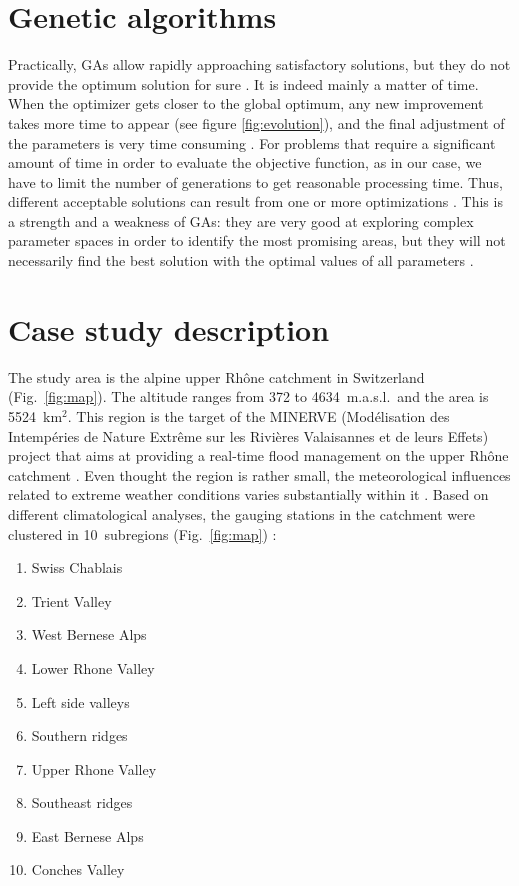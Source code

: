 \documentclass[5p]{elsarticle}
\begin{document}
\section{Genetic algorithms}
\label{sec:gas}



Practically, GAs allow rapidly approaching satisfactory solutions, but they do not provide the optimum solution for sure \citep{Zitzler2004a}. It is indeed mainly a matter of time. When the optimizer gets closer to the global optimum, any new improvement takes more time to appear (see figure \ref{fig:evolution}), and the final adjustment of the parameters is very time consuming \citep{Back1993a}. For problems that require a significant amount of time in order to evaluate the objective function, as in our case, we have to limit the number of generations to get reasonable processing time. Thus, different acceptable solutions can result from one or more optimizations \citep{Holland1992b}. This is a strength and a weakness of GAs: they are very good at exploring complex parameter spaces in order to identify the most promising areas, but they will not necessarily find the best solution with the optimal values of all parameters \citep{Holland1992b}.







\section{Case study description}
\label{sec:case_study}

The study area is the alpine upper Rh\^{o}ne catchment in Switzerland (Fig.\ \ref{fig:map}). The altitude ranges from 372 to 4634~m.a.s.l.\ and the area is 5524~km$^{2}$. This region is the target of the MINERVE (Mod\'{e}lisation des Intemp\'{e}ries de Nature Extr\^{e}me sur les Rivi\`{e}res Valaisannes et de leurs Effets) project that aims at providing a real-time flood management on the upper Rh\^{o}ne catchment \citep{GarciaHernandez2009b}. Even thought the region is rather small, the meteorological influences related to extreme weather conditions varies substantially within it \citep[see][]{Horton2012}. Based on different climatological analyses, the gauging stations in the catchment were clustered in 10~subregions (Fig.\ \ref{fig:map}) :

\begin{enumerate}
	\item Swiss Chablais
	\item Trient Valley
	\item West Bernese Alps
	\item Lower Rhone Valley
	\item Left side valleys
	\item Southern ridges
	\item Upper Rhone Valley
	\item Southeast ridges
	\item East Bernese Alps
	\item Conches Valley
\end{enumerate}
\end{document}
